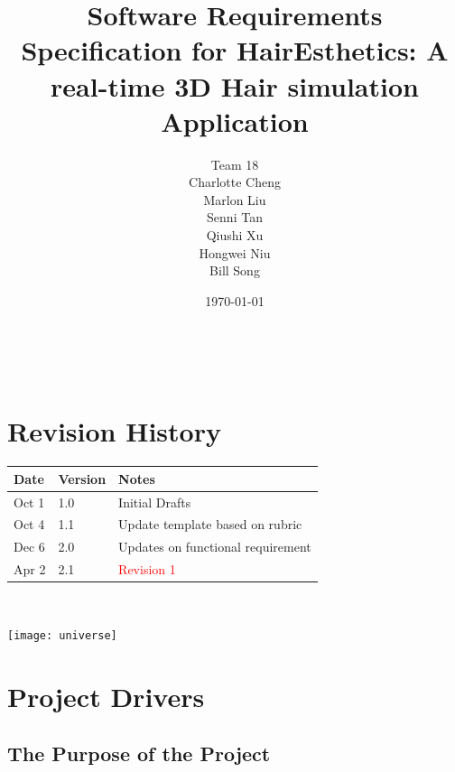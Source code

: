 \documentclass[12pt]{article}
\begin{document}
\title{Software Requirements Specification for HairEsthetics: A real-time 3D Hair simulation Application} 

\author{Team 18 \\ Charlotte Cheng
        \\ Marlon Liu
        \\ Senni Tan
        \\ Qiushi Xu
        \\ Hongwei Niu
        \\ Bill Song
}

\date{\today}
	
\maketitle

~\newpage


\tableofcontents
\listoftables
\listoffigures

\section*{Revision History}

\begin{tabularx}{\textwidth}{p{3cm}p{2cm}X}
\toprule {\bf Date} & {\bf Version} & {\bf Notes}\\
\midrule
Oct 1 & 1.0 & Initial Drafts\\
Oct 4 & 1.1 & Update template based on rubric\\
Dec 6 & 2.0 & Updates on functional requirement \\
Apr 2 & 2.1 & \textcolor{red}{Revision 1} \\ 
\bottomrule
\end{tabularx}

~\newpage

  

\texttt{[image: universe]}

\section{Project Drivers}

\subsection{The Purpose of the Project}
  
\end{document}
